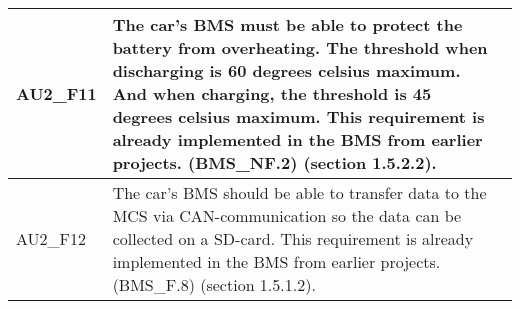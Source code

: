 \begin{longtable}{|p{2 cm}|p{7 cm}|p{4 cm}|}
		AU2\_F11	& The car's BMS must be able to protect the battery from overheating. The threshold when discharging is 60 degrees celsius maximum. And when charging, the threshold is 45 degrees celsius maximum. This requirement is already implemented in the BMS from earlier projects. (BMS\_NF.2)\cite{BMSDocumentation} (section 1.5.2.2). &   \\\hline
		AU2\_F12	& The car's BMS should be able to transfer data to the MCS via CAN-communication so the data can be collected on a SD-card. This requirement is already implemented in the BMS from earlier projects. (BMS\_F.8)\cite{BMSDocumentation} (section 1.5.1.2). &   \\\hline
\end{longtable}